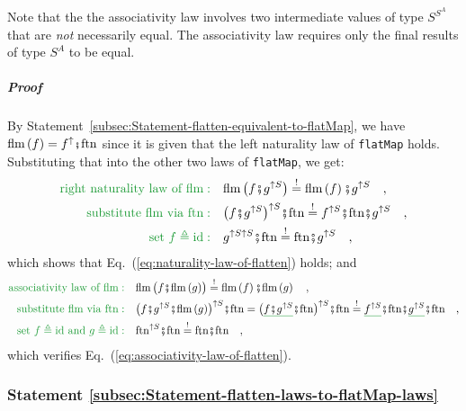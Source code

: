 Note that the the associativity law involves two intermediate values
of type $S^{S^{A}}$ that are \emph{not} necessarily equal. The associativity
law requires only the final results of type $S^{A}$ to be equal.

\subparagraph{Proof}

By Statement~\ref{subsec:Statement-flatten-equivalent-to-flatMap},
we have $\text{flm}\left(f\right)=f^{\uparrow}\bef\text{ftn}$ since
it is given that the left naturality law of \lstinline!flatMap! holds.
Substituting that into the other two laws of \lstinline!flatMap!,
we get:
\begin{align*}
{\color{greenunder}\text{right naturality law of }\text{flm}:}\quad & \text{flm}\,\big(f\bef g^{\uparrow S}\big)\overset{!}{=}\text{flm}\left(f\right)\bef g^{\uparrow S}\quad,\\
{\color{greenunder}\text{substitute \ensuremath{\text{flm}} via }\text{ftn}:}\quad & \big(f\bef g^{\uparrow S}\big)^{\uparrow S}\bef\text{ftn}\overset{!}{=}f^{\uparrow S}\bef\text{ftn}\bef g^{\uparrow S}\quad,\\
{\color{greenunder}\text{set }f\triangleq\text{id}:}\quad & g^{\uparrow S\uparrow S}\bef\text{ftn}\overset{!}{=}\text{ftn}\bef g^{\uparrow S}\quad,
\end{align*}
which shows that Eq.~(\ref{eq:naturality-law-of-flatten}) holds;
and
\begin{align*}
{\color{greenunder}\text{associativity law of }\text{flm}:}\quad & \text{flm}\,\big(f\bef\text{flm}\,(g)\big)\overset{!}{=}\text{flm}\left(f\right)\bef\text{flm}\left(g\right)\quad,\\
{\color{greenunder}\text{substitute \ensuremath{\text{flm}} via }\text{ftn}:}\quad & \big(f\bef g^{\uparrow S}\bef\text{flm}\,(g)\big)^{\uparrow S}\bef\text{ftn}=\big(\gunderline{f\bef g^{\uparrow S}}\bef\text{ftn}\big)^{\uparrow S}\bef\text{ftn}\overset{!}{=}\gunderline{f^{\uparrow S}}\bef\text{ftn}\bef\gunderline{g^{\uparrow S}}\bef\text{ftn}\quad,\\
{\color{greenunder}\text{set }f\triangleq\text{id}\text{ and }g\triangleq\text{id}:}\quad & \text{ftn}^{\uparrow S}\bef\text{ftn}\overset{!}{=}\text{ftn}\bef\text{ftn}\quad,
\end{align*}
which verifies Eq.~(\ref{eq:associativity-law-of-flatten}).

\subsubsection{Statement \label{subsec:Statement-flatten-laws-to-flatMap-laws}\ref{subsec:Statement-flatten-laws-to-flatMap-laws}}

